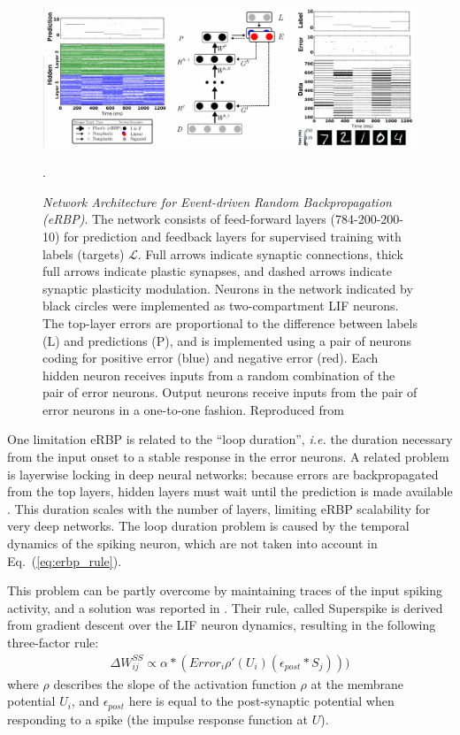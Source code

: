 \documentclass[english]{article}
\renewcommand{\refeq}[1]{{Eq.~(\ref{#1})}}
\renewcommand{\cite}{\citep}
\begin{document}
  \begin{figure}
    \begin{center}
      \includegraphics[width=.8\textwidth] {img/eDP_ML_withdata.pdf}
      \hspace{3pt}
    \end{center}
    \caption{
      \label{fig:erbp} 
      \emph{Network Architecture for Event-driven Random Backpropagation (eRBP)}.
    The network consists of feed-forward layers (784-200-200-10) for prediction and feedback layers for supervised training with labels (targets) $\mathcal{L}$.
    Full arrows indicate synaptic connections, thick full arrows indicate plastic synapses, and dashed arrows indicate synaptic plasticity modulation.
    Neurons in the network indicated by black circles were implemented as two-compartment \ac{LIF} neurons.
    The top-layer errors are proportional to the difference between labels (L) and predictions (P), and is implemented using a pair of neurons coding for positive error (blue) and negative error (red).
    Each hidden neuron receives inputs from a random combination of the pair of error neurons.
    Output neurons receive inputs from the pair of error neurons in a one-to-one fashion.
    Reproduced from \cite{Neftci_etal17_evenrand}}.
\end{figure}

One limitation \ac{eRBP} is related to the ``loop duration'', \emph{i.e.} the duration necessary from the input onset to a stable response in the error neurons. 
A related problem is layerwise locking in deep neural networks: because errors are backpropagated from the top layers, hidden layers must wait until the prediction is made available \cite{Jaderberg_etal16_deconeur}. 
This duration scales with the number of layers, limiting \ac{eRBP} scalability for very deep networks.
The loop duration problem is caused by the temporal dynamics of the spiking neuron, which are not taken into account in \refeq{eq:erbp_rule}. 

This problem can be partly overcome by maintaining traces of the input spiking activity, and a solution was reported in \cite{Zenke_Ganguli17_supesupe}. 
Their rule, called Superspike is derived from gradient descent over the \ac{LIF} neuron dynamics, resulting in the following three-factor rule:
\begin{align}\label{eq:ss_rule}
\Delta W_{ij}^{SS} \propto  \alpha \ast (Error_i \rho'(U_i) (\epsilon_{post} \ast S_j)))
\end{align}
where $\rho$ describes the slope of the activation function $\rho$ at the membrane potential $U_i$, and $\epsilon_{post}$ here is equal to the post-synaptic potential when responding to a spike (the impulse response function at $U$).
\end{document}
